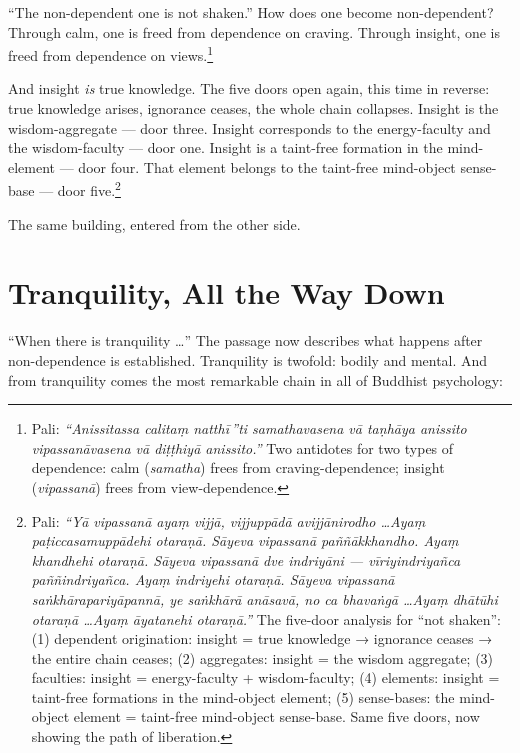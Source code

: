 ``The non-dependent one is not shaken.'' How does one become non-dependent? Through calm, one is freed from dependence on craving. Through insight, one is freed from dependence on views.\footnote{Pali: \textit{``Anissitassa calitaṃ natthī\,''ti samathavasena vā taṇhāya anissito vipassanāvasena vā diṭṭhiyā anissito.''} Two antidotes for two types of dependence: calm (\textit{samatha}) frees from craving-dependence; insight (\textit{vipassanā}) frees from view-dependence.}

And insight \textit{is} true knowledge. The five doors open again, this time in reverse: true knowledge arises, ignorance ceases, the whole chain collapses. Insight is the wisdom-aggregate --- door three. Insight corresponds to the energy-faculty and the wisdom-faculty --- door one. Insight is a taint-free formation in the mind-element --- door four. That element belongs to the taint-free mind-object sense-base --- door five.\footnote{Pali: \textit{``Yā vipassanā ayaṃ vijjā, vijjuppādā avijjānirodho \ldots Ayaṃ paṭiccasamuppādehi otaraṇā. Sāyeva vipassanā paññākkhandho. Ayaṃ khandhehi otaraṇā. Sāyeva vipassanā dve indriyāni --- vīriyindriyañca paññindriyañca. Ayaṃ indriyehi otaraṇā. Sāyeva vipassanā saṅkhārapariyāpannā, ye saṅkhārā anāsavā, no ca bhavaṅgā \ldots Ayaṃ dhātūhi otaraṇā \ldots Ayaṃ āyatanehi otaraṇā.''} The five-door analysis for ``not shaken'': (1) dependent origination: insight = true knowledge → ignorance ceases → the entire chain ceases; (2) aggregates: insight = the wisdom aggregate; (3) faculties: insight = energy-faculty + wisdom-faculty; (4) elements: insight = taint-free formations in the mind-object element; (5) sense-bases: the mind-object element = taint-free mind-object sense-base. Same five doors, now showing the path of liberation.}

The same building, entered from the other side.

\section*{Tranquility, All the Way Down}

``When there is tranquility \ldots'' The passage now describes what happens after non-dependence is established. Tranquility is twofold: bodily and mental. And from tranquility comes the most remarkable chain in all of Buddhist psychology:

